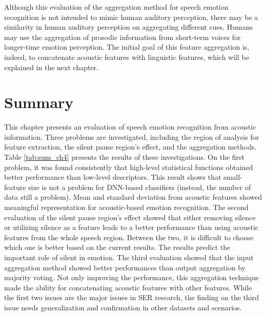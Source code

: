 Although this evaluation of the aggregation method for speech emotion
recognition is not intended to mimic human auditory perception, there may be a
similarity in human auditory perception on aggregating different cues. Humans
may use the aggregation of prosodic information from short-term voices for
longer-time emotion perception. The initial goal of this feature aggregation
is, indeed, to concatenate acoustic features with linguistic features, which
will be explained in the next chapter. 

\section{Summary}
This chapter presents an evaluation of speech emotion recognition from acoustic
information. Three problems are investigated, including the region of analysis
for feature extraction, the silent pause region's effect, and the aggregation
methods. Table \ref{tab:sum_ch4} presents the results of these investigations.
On the first problem, it was found consistently that high-level statistical
functions obtained better performance than low-level descriptors.  This result
shows that small-feature size is not a problem for DNN-based classifiers
(instead, the number of data still a problem). Mean and standard deviation from
acoustic features showed meaningful representation for acoustic-based emotion
recognition. The second evaluation of the silent pause region's effect showed
that either removing silence or utilizing silence as a feature leads to a
better performance than using acoustic features from the whole speech region.
Between the two, it is difficult to choose which one is better based on the
current results. The results predict the important role of silent in emotion.
The third evaluation showed that the input aggregation method showed better
performances than output aggregation by majority voting. Not only improving the
performance, this aggregation technique made the ability for concatenating
acoustic features with other features. While the first two issues are the major
issues in SER research, the finding on the third issue needs generalization and
confirmation in other datasets and scenarios.

